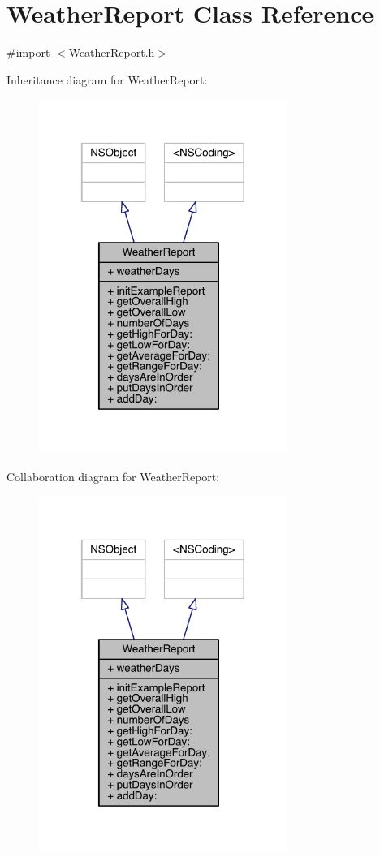 \hypertarget{interface_weather_report}{\section{Weather\-Report Class Reference}
\label{interface_weather_report}
}


{\ttfamily \#import $<$Weather\-Report.\-h$>$}



Inheritance diagram for Weather\-Report\-:\nopagebreak
\begin{figure}[H]
\begin{center}
\leavevmode
\includegraphics[width=229pt]{interface_weather_report__inherit__graph}
\end{center}
\end{figure}


Collaboration diagram for Weather\-Report\-:\nopagebreak
\begin{figure}[H]
\begin{center}
\leavevmode
\includegraphics[width=229pt]{interface_weather_report__coll__graph}
\end{center}
\end{figure}

